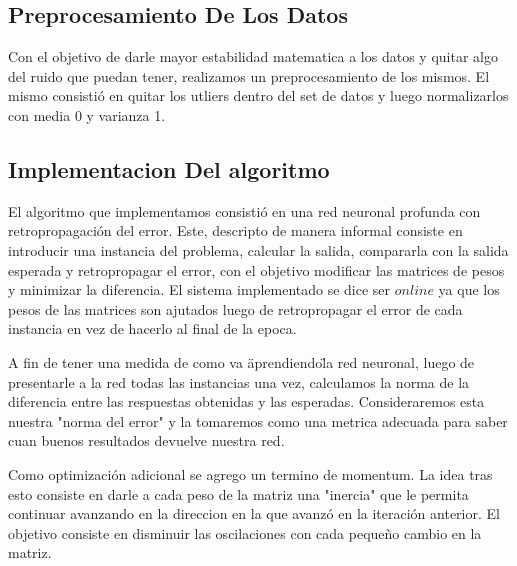 \subsection{Preprocesamiento De Los Datos} 
Con el objetivo de darle mayor estabilidad matematica a los datos y quitar algo del ruido que puedan tener, realizamos un preprocesamiento de los mismos. El mismo consistió en quitar los utliers dentro del set de datos y luego normalizarlos con media 0 y varianza 1.

\subsection{Implementacion Del algoritmo} 

El algoritmo que implementamos consistió en una red neuronal profunda con retropropagación del error. Este, descripto de manera informal consiste en introducir una instancia del problema, calcular la salida, compararla con la salida esperada y retropropagar el error, con el objetivo modificar las matrices de pesos y minimizar la diferencia. El sistema implementado se dice ser $online$ ya que los pesos de las matrices son ajutados luego de retropropagar el error de cada instancia en vez de hacerlo al final de la epoca.

A fin de tener una medida de como va \"aprendiendo\" la red neuronal, luego de presentarle a la red todas las instancias una vez, calculamos la norma de la diferencia entre las respuestas obtenidas y las esperadas. Consideraremos esta nuestra "norma del error" y la tomaremos como una metrica adecuada para saber cuan buenos resultados devuelve nuestra red.



Como optimización adicional se agrego un termino de momentum. La idea tras esto consiste en darle a cada peso de la matriz una "inercia" que le permita continuar avanzando en la direccion en la que avanzó en la iteración anterior. El objetivo consiste en disminuir las oscilaciones con cada pequeño cambio en la matriz.

